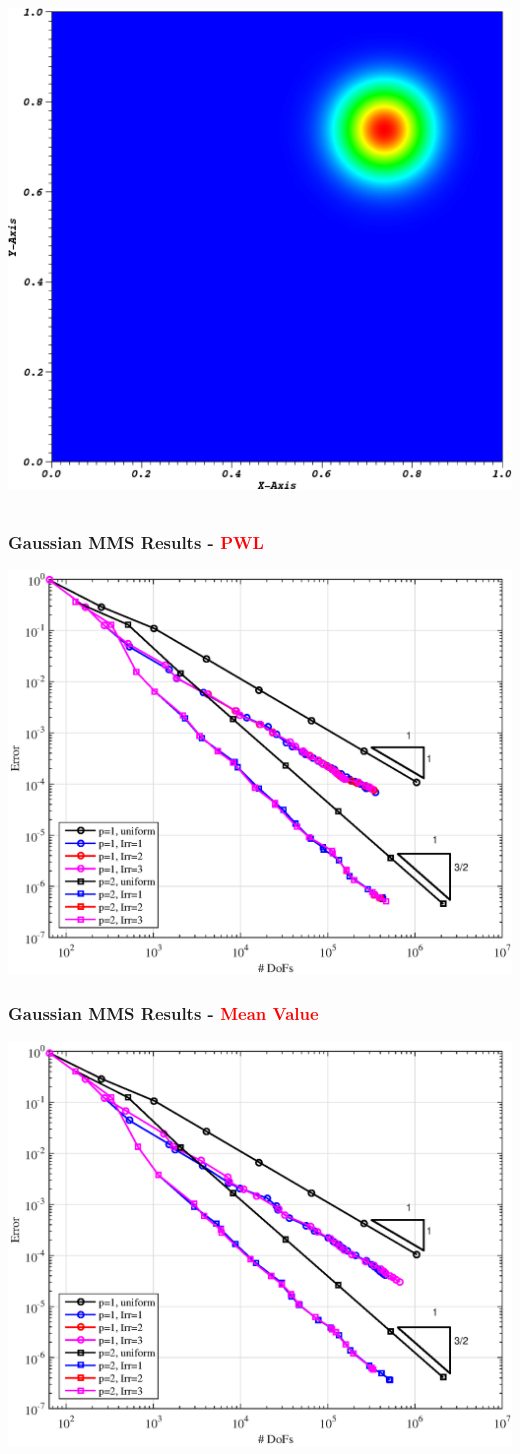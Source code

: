 \documentclass[compress,10pt]{beamer}
\newcommand{\tcr}[1]{\textcolor{red}{#1}}
\begin{document}
\begin{frame}[t]
{\begin{columns}
{}\includegraphics[width=0.70\columnwidth]{images/ME2_cart_Irr=1_tol=0.1_cyc08_sol.eps}
\end{columns}
}
{
\frametitle{Gaussian MMS Results - \tcr{PWL}}
\hspace*{1.25cm}
{}\includegraphics[width=0.75\columnwidth]{images/TransportMMS_Gauss2D_PWL_Err.eps}
}
{
\frametitle{Gaussian MMS Results - \tcr{Mean Value}}
\hspace*{1.25cm}
{}\includegraphics[width=0.75\columnwidth]{images/TransportMMS_Gauss2D_MV_Err.eps}
}
\end{frame}
\end{document}
